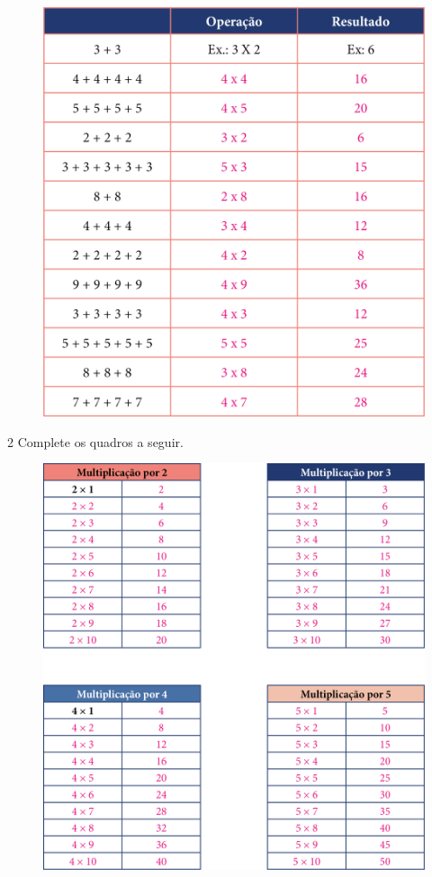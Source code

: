 \begin{figure}[htpb!]
\centering
\includegraphics[width=.7\textwidth]{./media/image104.png}
\end{figure}

\pagebreak
\num{2} Complete os quadros a seguir.

\begin{figure}[htpb!]
\includegraphics[width=\textwidth]{./media/image105.png}
\end{figure}


